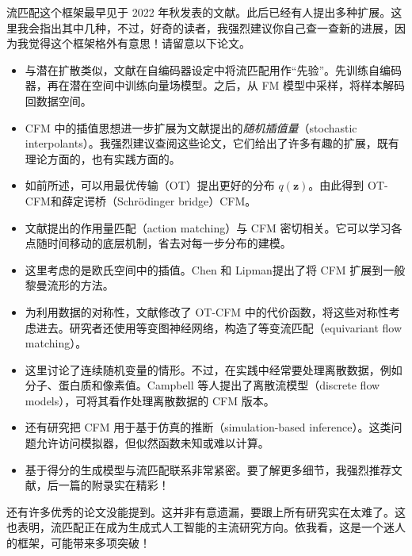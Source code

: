 流匹配这个框架最早见于 2022 年秋发表的文献。此后已经有人提出多种扩展。这里我会指出其中几种，不过，好奇的读者，我强烈建议你自己查一查新的进展，因为我觉得这个框架格外有意思！请留意以下论文。
\begin{itemize}
  \item 与潜在扩散类似，文献在自编码器设定中将流匹配用作“先验”。先训练自编码器，再在潜在空间中训练向量场模型。之后，从 FM 模型中采样，将样本解码回数据空间。
  \item CFM 中的插值思想进一步扩展为文献提出的\emph{随机插值量}（stochastic interpolants）。我强烈建议查阅这些论文，它们给出了许多有趣的扩展，既有理论方面的，也有实践方面的。
  \item 如前所述，可以用最优传输（OT）提出更好的分布 $q(\mathbf z)$。由此得到 OT-CFM和薛定谔桥（Schrödinger bridge）CFM。
  \item 文献提出的作用量匹配（action matching）与 CFM 密切相关。它可以学习各点随时间移动的底层机制，省去对每一步分布的建模。
  \item 这里考虑的是欧氏空间中的插值。Chen 和 Lipman提出了将 CFM 扩展到一般黎曼流形的方法。
  \item 为利用数据的对称性，文献修改了 OT-CFM 中的代价函数，将这些对称性考虑进去。研究者还使用等变图神经网络，构造了等变流匹配（equivariant flow matching）。
  \item 这里讨论了连续随机变量的情形。不过，在实践中经常要处理离散数据，例如分子、蛋白质和像素值。Campbell 等人提出了离散流模型（discrete flow models），可将其看作处理离散数据的 CFM 版本。
  \item 还有研究把 CFM 用于基于仿真的推断（simulation-based inference）。这类问题允许访问模拟器，但似然函数未知或难以计算。
  \item 基于得分的生成模型与流匹配联系非常紧密。要了解更多细节，我强烈推荐文献，后一篇的附录实在精彩！
\end{itemize}

还有许多优秀的论文没能提到。这并非有意遗漏，要跟上所有研究实在太难了。这也表明，流匹配正在成为生成式人工智能的主流研究方向。依我看，这是一个迷人的框架，可能带来多项突破！

